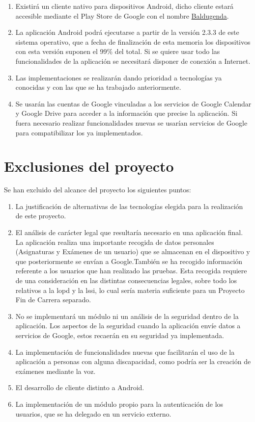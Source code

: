 \begin{enumerate}
	\item Existirá un cliente nativo para dispositivos Android, dicho cliente estará accesible mediante el Play Store de Google con el nombre \href{https://play.google.com/store/apps/details?id=com.mikel.agenda&hl=es}{Baldugenda}.
	\item La aplicación Android podrá ejecutarse a partir de la versión 2.3.3 de este sistema operativo, que a fecha de finalización de esta memoria los dispositivos con esta versión suponen el 99\% del total. Si se quiere usar todo las funcionalidades de la aplicación se necesitará disponer de conexión a Internet.
	\item Las implementaciones se realizarán dando prioridad a tecnologías ya conocidas y con las que se ha trabajado anteriormente.
	\item Se usarán las cuentas de Google vinculadas a los servicios de Google Calendar y Google Drive para acceder a la información que precise la aplicación. Si fuera necesario realizar funcionalidades nuevas se usarían servicios de Google para compatibilizar los ya implementados.
\end{enumerate}
\newpage
\section{Exclusiones del proyecto}
\label{secc:Exclusiones}

Se han excluido del alcance del proyecto los siguientes puntos:

\begin{enumerate}
	\item La justificación de alternativas de las tecnologías elegida para la realización de este proyecto. 
	\item El análisis de carácter legal que resultaría necesario en una aplicación final. La aplicación realiza una importante recogida de datos personales (Asignaturas y Exámenes de un usuario) que se almacenan en el dispositivo y que posteriormente se envían a Google.También se ha recogido información referente a los usuarios que han realizado las pruebas. Esta recogida requiere de una consideración en las distintas consecuencias legales, sobre todo los relativos a la \acrfull{lopd} y la \acrfull{lssi}, lo cual sería materia suficiente para un Proyecto Fin de Carrera separado.
	\item No se implementará un módulo ni un análisis de la seguridad dentro de la aplicación. Los aspectos de la seguridad cuando la aplicación envíe datos a servicios de Google, estos recaerán en su seguridad ya implementada.
	\item La implementación de funcionalidades nuevas que facilitarán el uso de la aplicación a personas con alguna discapacidad, como podría ser la creación de exámenes mediante la voz. 
	\item El desarrollo de cliente distinto a Android.
	\item La implementación de un módulo propio para la autenticación de los usuarios, que se ha delegado en un servicio externo.
\end{enumerate}
\newpage
